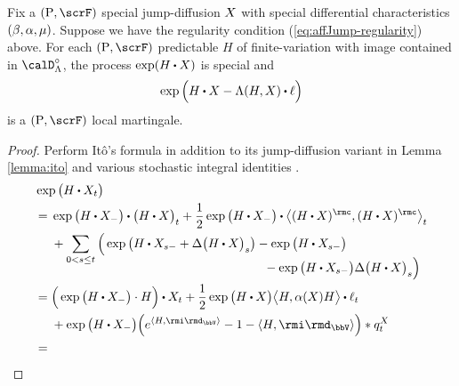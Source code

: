 \begin{theorem}
  \label{theorem:LK-exponential-martingale}
  Fix a $(\Prb, \scrF)$ special jump-diffusion $X$ with special differential characteristics $(\beta, \alpha, \mu)$.
  Suppose we have the regularity condition (\ref{eq:affJump-regularity}) above.
  For each $(\Prb, \scrF)$ predictable $H$ of finite-variation with image contained in $\odeSpace^\circ$, the process $\exp(H \shortInt \X)$ is special and 
  \[
    \exp\Big(H \shortInt \X - \ode(H, \X) \shortInt \leb\Big)
  \]
  is a $(\Prb, \scrF)$ local martingale.
\end{theorem}
\begin{proof}
  \label{proof:theorem:LK-exponential-martingale}
  Perform It\^o's formula \cite[Theoerem I.4.57]{jacod2003} in addition to its jump-diffusion variant in Lemma \ref{lemma:ito} and various stochastic integral identities \cite[Remarks I.4.36, I.4.37, Theorem I.4.40(d), Proposition II.1.30(b)]{jacod2003}.
  \begin{align}
    \notag
    &\exp\big( H \shortInt \X_t \big) \\
    \notag
    &= \begin{aligned}[t]
      &\exp\big( H \shortInt \X_- \big) \shortInt \big( H \shortInt \X \big)_t 
      + \frac12 \exp\big( H \shortInt \X_- \big) \shortInt \bprj{(H\shortInt \X)^\rmc}{(H\shortInt\X)^\rmc}_t \\
      &+ \sum_{0<s\leq t} \Big(\begin{aligned}[t]
        &\exp\big(H \shortInt \X_{s-} 
        + \Delta\big(H \shortInt \X\big)_s \big) 
        - \exp\big(H\shortInt \X_{s-}\big) \\
        &\hspace{45mm}- \exp\big(H \shortInt\X_{s-}\big) \Delta \big(H \shortInt \X\big)_s\Big)
      \end{aligned}
    \end{aligned} \\
    \notag
    &= \begin{aligned}[t]
      &\Big(\exp\big( H \shortInt \X_- \big) \cdot H \Big) \shortInt \X_t 
      + \frac12 \exp\big( H \shortInt \X \big) \bprj{H}{\affDiff(\X)H} \shortInt \leb_t \\
      &+ \exp\big(H\shortInt\X_-\big) \Big( e^{\prj{H}{\id_\vecSpace}} - 1 - \prj{H}{\id_\vecSpace} \Big) \ast \jumpMeas^\X_t
    \end{aligned} \\
    \label{eq:LK-exp-ito-pause}
    &= \begin{aligned}[t]

\end{aligned}
\end{align}
\end{proof}
